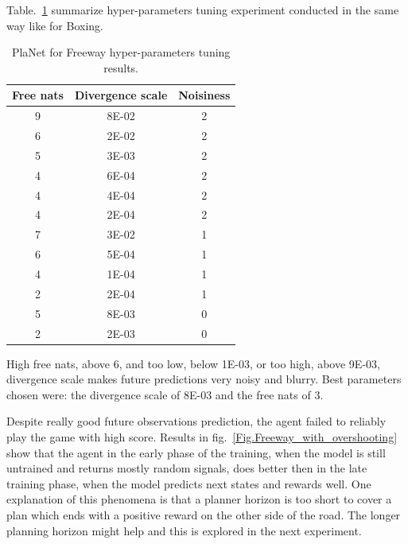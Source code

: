 Table.~\ref{Table.PlaNet_Freeway_tuning} summarize hyper-parameters tuning experiment conducted in the same way like for Boxing.

\begin{table}[H]
\centering
\begin{tabular}{| c | c | c |} 
\hline
Free nats & Divergence scale & Noisiness \\
\hline
9 & 8E-02 & 2 \\
6 & 2E-02 & 2 \\
5 & 3E-03 & 2 \\
4 & 6E-04 & 2 \\
4 & 4E-04 & 2 \\
4 & 2E-04 & 2 \\
7 & 3E-02 & 1 \\
6 & 5E-04 & 1 \\
4 & 1E-04 & 1 \\
2 & 2E-04 & 1 \\
5 & 8E-03 & 0 \\
2 & 2E-03 & 0 \\
\hline
\end{tabular}
\caption{PlaNet for Freeway hyper-parameters tuning results.}
\label{Table.PlaNet_Freeway_tuning}
\end{table}

High free nats, above 6, and too low, below 1E-03, or too high, above 9E-03, divergence scale makes future predictions very noisy and blurry. Best parameters chosen were: the divergence scale of 8E-03 and the free nats of 3.

Despite really good future observations prediction, the agent failed to reliably play the game with high score. Results in fig.~\ref{Fig.Freeway_with_overshooting} show that the agent in the early phase of the training, when the model is still untrained and returns mostly random signals, does better then in the late training phase, when the model predicts next states and rewards well. One explanation of this phenomena is that a planner horizon is too short to cover a plan which ends with a positive reward on the other side of the road. The longer planning horizon might help and this is explored in the next experiment.

